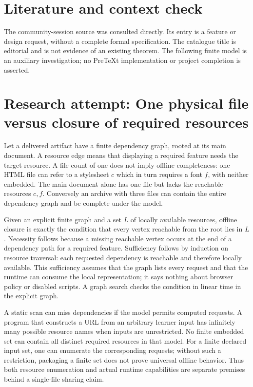 \documentclass[11pt]{article}
\begin{document}
\section{Literature and context check}
The community-session source was consulted directly. Its entry is a feature or design request, without a complete formal specification. The catalogue title is editorial and is not evidence of an existing theorem. The following finite model is an auxiliary investigation; no PreTeXt implementation or project completion is asserted.
\section{Research attempt: One physical file versus closure of required resources}
Let a delivered artifact have a finite dependency graph, rooted at its main document. A resource edge means that displaying a required feature needs the target resource. A file count of one does not imply offline completeness: one HTML file can refer to a stylesheet $c$ which in turn requires a font $f$, with neither embedded. The main document alone has one file but lacks the reachable resources $c,f$. Conversely an archive with three files can contain the entire dependency graph and be complete under the model.

Given an explicit finite graph and a set $L$ of locally available resources, offline closure is exactly the condition that every vertex reachable from the root lies in $L$. Necessity follows because a missing reachable vertex occurs at the end of a dependency path for a required feature. Sufficiency follows by induction on resource traversal: each requested dependency is reachable and therefore locally available. This sufficiency assumes that the graph lists every request and that the runtime can consume the local representation; it says nothing about browser policy or disabled scripts. A graph search checks the condition in linear time in the explicit graph.

A static scan can miss dependencies if the model permits computed requests. A program that constructs a URL from an arbitrary learner input has infinitely many possible resource names when inputs are unrestricted. No finite embedded set can contain all distinct required resources in that model. For a finite declared input set, one can enumerate the corresponding requests; without such a restriction, packaging a finite set does not prove universal offline behavior. Thus both resource enumeration and actual runtime capabilities are separate premises behind a single-file sharing claim.
\end{document}
